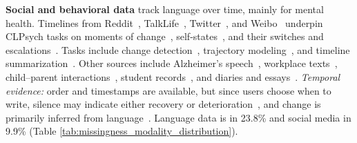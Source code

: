 \documentclass[11pt]{article}
\newcommand{\xref}[2]{
\hyperref[#1]{\underline{\textcolor{blue}{#2~\ref*{#1}}}}}
\theoremstyle{plain}
\theoremstyle{definition}
\theoremstyle{remark}
\begin{document}
\noindent\textbf{Social and behavioral data} track language over time, mainly for mental health. Timelines from Reddit~\cite{harrigian-dredze-2022-now}, TalkLife~\cite{tsakalidis-etal-2022-identifying}, Twitter~\cite{8914586}, and Weibo~\cite{8731609} underpin CLPsych tasks on moments of change~\cite{tsakalidis-etal-2022-overview,bucur-etal-2022-capturing}, self-states~\cite{tseriotou-etal-2025-overview}, and their switches and escalations~\citep{ali-etal-2026-overview}. Tasks include change detection~\cite{tsakalidis-etal-2022-identifying}, trajectory modeling~\cite{bayram-benhiba-2022-emotionally,tseriotou-etal-2023-sequential}, and timeline summarization~\cite{matero-etal-2024-using,song-etal-2024-combining,song-etal-2025-temporal}. Other sources include Alzheimer's speech~\cite{petti-korhonen-2024-losst}, workplace texts~\citep{hayashi-etal-2024-estimation}, child--parent interactions~\citep{liu-prudhommeaux-2023-data}, student records~\citep{hayat-etal-2025-three}, and diaries and essays~\citep{gan-etal-2026-multi}. \emph{Temporal evidence:} order and timestamps are available, but since users choose when to write, silence may indicate either recovery or deterioration~\cite{harrigian-dredze-2022-now,tabak2020temporalmentalhealthdynamics}, and change is primarily inferred from language~\cite{tseriotou2024tempoformer}. Language data is in 23.8\% and social media in 9.9\% (Table \ref{tab:missingness_modality_distribution}).%
\end{document}
